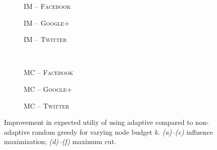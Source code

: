 \documentclass{article}
\newlength\figureheight
\newlength\figurewidth
\newcommand{\fbook}{\textsc{Facebook}\xspace}
\newcommand{\gplus}{\textsc{Google+}\xspace}
\newcommand{\twitter}{\textsc{Twitter}\xspace}
\newcommand{\infmax}{IM\xspace}
\newcommand{\maxcut}{MC\xspace}
\begin{document}
\setlength{}
\setlength{}
\newcommand{\subflen}{0.33\textwidth}
\newcommand{\scspacey}{0em}
\newcommand{\scspacex}{0.2em}
\begin{figure}[tb]
  \begin{subfigure}[b]{\subflen}
    \centering
    
    \vspace{\scspacey}
    \caption{\hspace{\scspacex}\infmax{} -- \fbook}
    \label{fig:inf_ego_fb}
  \end{subfigure}
  \hfill
  \begin{subfigure}[b]{\subflen}
    
    \vspace{\scspacey}
    \caption{\hspace{\scspacex}\infmax{} -- \gplus}
    \label{fig:inf_gplus}
  \end{subfigure}
  \hfill
  \begin{subfigure}[b]{\subflen}
    
    \vspace{\scspacey}
    \caption{\hspace{\scspacex}\infmax{} -- \twitter}
    \label{fig:inf_twitter}
  \end{subfigure}\\[0.5em]
  \begin{subfigure}[b]{\subflen}
    
    \vspace{\scspacey}
    \caption{\hspace{\scspacex}\maxcut{} -- \fbook}
    \label{fig:mc_ego_fb}
  \end{subfigure}
  \hfill
  \begin{subfigure}[b]{\subflen}
    
    \vspace{\scspacey}
    \caption{\hspace{\scspacex}\maxcut{} -- \gplus}
    \label{fig:mc_gplus}
  \end{subfigure}
  \hfill
  \begin{subfigure}[b]{\subflen}
    
    \vspace{\scspacey}
    \caption{\hspace{\scspacex}\maxcut{} -- \twitter}
    \label{fig:mc_twitter}
  \end{subfigure}
  \caption{
    Improvement in expected utiliy of using adaptive compared to non-adaptive random greedy for varying node budget $k$.
    \emph{(a)--(c)} influence maximization; \emph{(d)--(f)} maximum cut.
  }
  \label{fig:exp1}
\end{figure}
\end{document}
